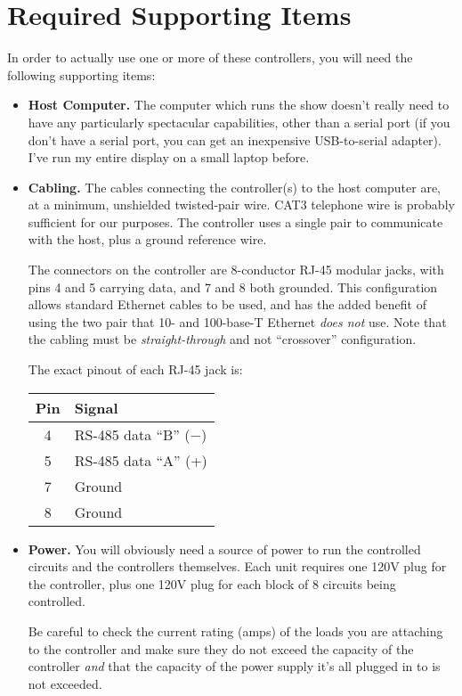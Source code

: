 \documentclass[12pt]{article}
\begin{document}
\section{Required Supporting Items}
In order to actually use one or more of these controllers, you will
need the following supporting items:
\begin{itemize}
\item
{\bf Host Computer.}
The computer which runs the show doesn't really need to have any 
particularly spectacular capabilities, other than a serial port (if you
don't have a serial port, you can get an inexpensive USB-to-serial
adapter).  I've run my entire display on a small laptop before.
\item
{\bf Cabling.}
The cables connecting the controller(s) to the host computer are, at a
minimum, unshielded twisted-pair wire.  CAT3 telephone wire is probably
sufficient for our purposes.  The controller uses a single pair to
communicate with the host, plus a ground reference wire.

The connectors on the controller are 8-conductor RJ-45 modular jacks,
with pins 4 and 5 carrying data, and 7 and 8 both grounded.  This configuration 
allows standard Ethernet cables to be used, and has the added benefit
of using the two pair that 10- and 100-base-T Ethernet {\em does not\/}
use.  Note that the cabling must be {\em straight-through\/} and not
``crossover'' configuration.

The exact pinout of each RJ-45 jack is:

\begin{center}
\begin{tabular}{|c|l|}\hline
\bf Pin & \bf Signal \\ \hline\hline
4 & RS-485 data ``B'' ($-$) \\\hline
5 & RS-485 data ``A'' (+) \\\hline
7 & Ground \\\hline
8 & Ground \\\hline
\end{tabular}
\end{center}

\item
{\bf Power.}
You will obviously need a source of power to run the controlled 
circuits and the controllers themselves.  Each unit requires
one 120V plug for the controller, plus one 120V plug for each block of 8
circuits being controlled.

Be careful to check the current rating (amps) of the loads you are
attaching to the controller and make sure they do not exceed the
capacity of the controller {\em and\/} that the capacity of the power
supply it's all plugged in to is not exceeded.


\end{itemize}
\end{document}
